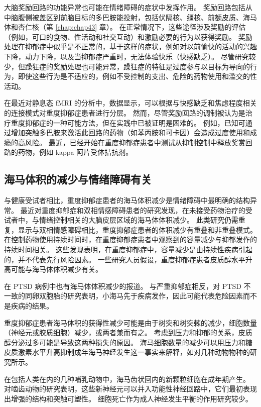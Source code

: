 大脑奖励回路的功能异常也可能在情绪障碍的症状中发挥作用。 奖励回路包括从中脑腹侧被盖区到前脑目标的多巴胺能投射，包括伏隔核、缰核、前额皮质、海马体和杏仁核（第 \ref{chap:chap43} 章）。 在正常情况下，这些途径涉及奖励的评估（例如，可口的食物、性活动和社交互动）和激励必要的行为以获得奖励。 奖励处理在抑郁症中似乎是不正常的，基于这样的症状，例如对以前愉快的活动的兴趣下降，动力下降，以及当抑郁症严重时，无法体验快乐（快感缺乏）。 尽管研究较少，但躁狂症的奖励处理也可能异常，躁狂症的特征是过度参与以目标为导向的行为，即使这些行为是不适应的，例如不受控制的支出、危险的药物使用和滥交的性活动。

在最近对静息态 fMRI 的分析中，数据显示，可以根据与快感缺乏和焦虑程度相关的连接模式对重度抑郁症患者进行分层。 然而，尽管奖励回路的调制被认为是治疗重度抑郁症的一种可能方法，但在实践中已被证明是困难的。 例如，已知可通过增加突触多巴胺来激活此回路的药物（如苯丙胺和可卡因）会造成过度使用和成瘾的高风险。 最近，已经开始在重度抑郁症患者中测试从抑制控制中释放奖赏回路的药物，例如 kappa 阿片受体拮抗剂。

\subsection{海马体积的减少与情绪障碍有关}
与健康受试者相比，重度抑郁症患者的海马体积减少是情绪障碍中最明确的结构异常。 最近对重度抑郁症和双相情感障碍患者的研究发现，在未接受药物治疗的受试者中，与情绪控制相关的大脑皮层区域的海马体体积减少。 此类研究仍需重复，显示与双相情感障碍相比，重度抑郁症患者的体积减少有重叠和非重叠模式。 在控制药物使用持续时间时，在重度抑郁症患者中观察到的容量减少与抑郁发作的持续时间相关。 这些发现表明，在重度抑郁症中，容量减少是由持续性疾病引起的，并不代表先行风险因素。 一些研究人员假设，重度抑郁症患者皮质醇水平升高可能与海马体体积减少有关。

在 PTSD 病例中也有海马体体积减少的报道。 与严重抑郁症相反，对 PTSD 不一致的同卵双胞胎的研究表明，小海马先于疾病发作，因此可能代表危险因素而不是疾病的结果。

重度抑郁症患者海马体积的获得性减少可能是由于树突和树突棘的减少，细胞数量（神经元或胶质细胞）减少，或两者兼而有之。 考虑到压力和抑郁的关系，皮质醇分泌过多可能是导致这两种损失的原因。 海马细胞数量的减少可以用压力和糖皮质激素水平升高抑制成年海马神经发生这一事实来解释，如对几种动物物种的研究所示。

在包括人类在内的几种哺乳动物中，海马齿状回内的新颗粒细胞在成年期产生。 对啮齿动物的研究表明，这些新神经元可以并入功能性神经回路中，它们最初表现出增强的结构和突触可塑性。 细胞死亡作为成人神经发生平衡的作用研究较少。

